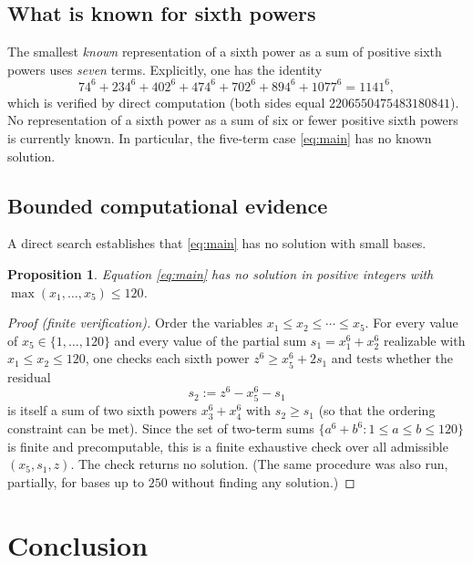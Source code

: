 \documentclass{amsart}
\newtheorem{proposition}{Proposition}
\begin{document}
\subsection*{What is known for sixth powers}
The smallest \emph{known} representation of a sixth power as a sum of
positive sixth powers uses \emph{seven} terms. Explicitly, one has the
identity
\begin{equation}\label{eq:seven}
74^6+234^6+402^6+474^6+702^6+894^6+1077^6=1141^6 ,
\end{equation}
which is verified by direct computation (both sides equal
$2206550475483180841$). No representation of a sixth power as a sum of
six or fewer positive sixth powers is currently known. In particular,
the five-term case \eqref{eq:main} has no known solution.

\subsection*{Bounded computational evidence}
A direct search establishes that \eqref{eq:main} has no solution with
small bases.

\begin{proposition}\label{prop:search}
Equation \eqref{eq:main} has no solution in positive integers with
$\max(x_1,\dots,x_5)\le 120$.
\end{proposition}

\begin{proof}[Proof (finite verification)]
Order the variables $x_1\le x_2\le\cdots\le x_5$. For every value of
$x_5\in\{1,\dots,120\}$ and every value of the partial sum
$s_1=x_1^6+x_2^6$ realizable with $x_1\le x_2\le 120$, one checks each
sixth power $z^6\ge x_5^6+2s_1$ and tests whether the residual
$$s_2:=z^6-x_5^6-s_1$$
is itself a sum of two sixth powers $x_3^6+x_4^6$ with
$s_2\ge s_1$ (so that the ordering constraint can be met). Since the
set of two-term sums $\{a^6+b^6: 1\le a\le b\le 120\}$ is finite and
precomputable, this is a finite exhaustive check over all admissible
$(x_5,s_1,z)$. The check returns no solution. (The same procedure was
also run, partially, for bases up to $250$ without finding any
solution.)
\end{proof}

\section*{Conclusion}
\end{document}
